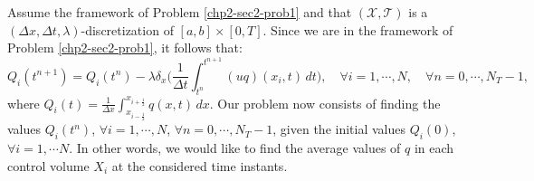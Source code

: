 \begin{prob}
    \label{chp2-sec2-prob2}
	Assume the framework of Problem \ref{chp2-sec2-prob1}
    and that $(\mathcal{X},\mathcal{T})$ is a $(\Delta x, \Delta t, \lambda)$-discretization of $[a,b]\times [0,T]$.
	Since we are in the framework of Problem \ref{chp2-sec2-prob1}, it follows that:
	\begin{equation}
			\label{1d-fvexact-scheme}
				{Q}_i(t^{n+1}) =  {Q}_i(t^{n}) -
				\lambda \delta _x\bigg( \frac{1}{\Delta t}\int_{t^{n}}^{t^{n+1}}
				{(uq)}(x_{i}, t) \,dt \bigg),
				\quad \forall i = 1, \cdots, N,
				\quad \forall n = 0, \cdots, N_T-1,
	\end{equation}
	where ${Q}_i(t) = \frac{1}{\Delta x}
	\int_{x_{i-\frac{1}{2}}}^{x_{i+\frac{1}{2}}} {q}(x,t) \,dx$.
	Our problem now consists of finding the values ${Q}_i(t^{n})$, 
	$\forall i = 1, \cdots, N$, $\forall n = 0, \cdots, N_T-1$,
	given the initial values ${Q}_i(0)$, $\forall i = 1, \cdots N$.
	In other words, we would like to find the average values of ${q}$
	in each control volume $X_i$ at the considered time instants.
\end{prob}

